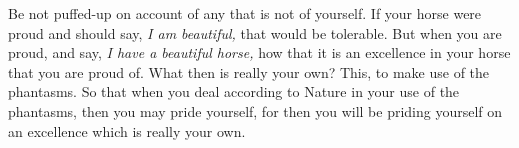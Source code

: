 Be not puffed-up on account of any that  is not of yourself. If your horse were
proud and should say, \emph{I am  beautiful,} that would be tolerable. But when
you are  proud, and say,  \emph{I have  a beautiful horse,}  how that it  is an
excellence in your horse  that you are proud of. What then  is really your own?
This, to make use  of the phantasms. So that when you  deal according to Nature
in your use of the phantasms, then you may pride yourself, for then you will be
priding yourself on an excellence which is really your own.
